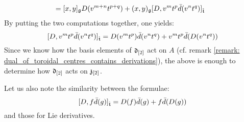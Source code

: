 \begin{remark}
\begin{enumerate}
$$\begin{aligned}
                            & = [x, y]_{\mathfrak{g}} D(v^{m + n} t^{p + q}) + (x, y)_{\mathfrak{g}} [D, v^m t^p \bar{d}(v^n t^q)]_{\hat{\mathfrak{t}}}
                        \end{aligned}
                    $$
                By putting the two computations together, one yields:
                    $$[D, v^m t^p \bar{d}(v^n t^q)]_{\hat{\mathfrak{t}}} = D(v^m t^p) \bar{d}(v^n t^q) + v^m t^p \bar{d}(D(v^n t^q))$$
                Since we know how the basis elements of $\mathfrak{d}_{[2]}$ act on $A$ (cf. remark \ref{remark: dual_of_toroidal_centres_contains_derivations}), the above is enough to determine how $\mathfrak{d}_{[2]}$ acts on $\mathfrak{z}_{[2]}$. 

                Let us also note the similarity between the formulae:
                    $$[D, f \bar{d}(g)]_{\hat{\mathfrak{t}}} = D(f) \bar{d}(g) + f \bar{d}(D(g))$$
                and those for Lie derivatives.
                

\end{enumerate}
\end{remark}
